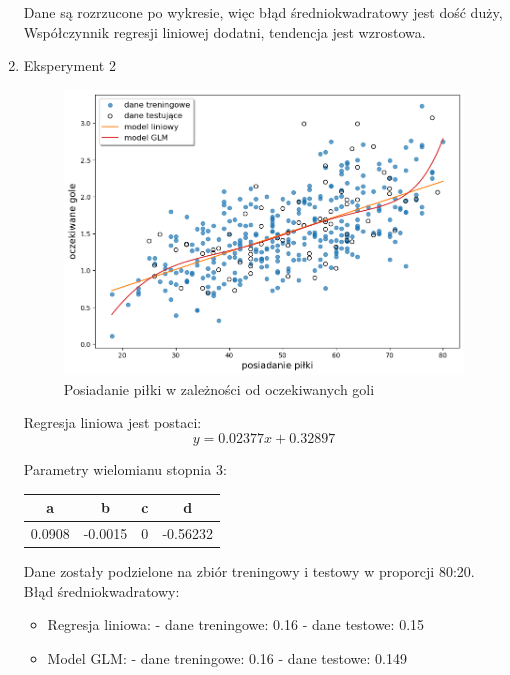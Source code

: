 \documentclass[11pt]{article}
\begin{document}
\begin{enumerate}[label=\alph*)]
    Dane są rozrzucone po wykresie, więc błąd średniokwadratowy jest dość duży, Współczynnik regresji liniowej dodatni, tendencja jest wzrostowa.
    \newpage
    \item Eksperyment 2 \newline

    \begin{figure}[hbt]
    \includegraphics[scale=0.30]{xgoals.png}
    \caption{Posiadanie piłki w zależności od oczekiwanych goli}
    \end{figure}
    Regresja liniowa jest postaci:
    \begin{equation}
    y = 0.02377x + 0.32897
    \end{equation}

    Parametry wielomianu stopnia 3:
    \begin{center}
    \begin{tabular}{| c | c | c | c |}
    \hline
    a & b & c & d \\ \hline
    0.0908 & -0.0015 & 0 & -0.56232 \\ \hline
    \end{tabular}
    \end{center}
    
    Dane zostały podzielone na zbiór treningowy i testowy w proporcji 80:20.
    \newline
    \newline
    Błąd średniokwadratowy:
    \begin{itemize}
    \item Regresja liniowa: \newline
    - dane treningowe: 0.16 \newline
    - dane testowe: 0.15
    \item Model GLM: \newline
    - dane treningowe: 0.16 \newline
    - dane testowe: 0.149
    \end{itemize}
    

\end{enumerate}
\end{document}
